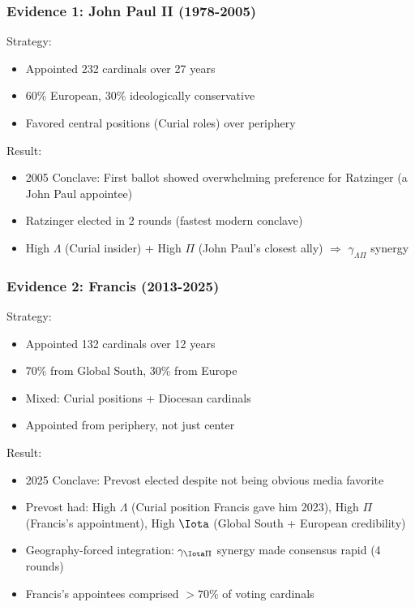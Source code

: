 \subsubsection{Evidence 1: John Paul II (1978-2005)}

Strategy:
\begin{itemize}
\item Appointed 232 cardinals over 27 years
\item 60\% European, 30\% ideologically conservative
\item Favored central positions (Curial roles) over periphery
\end{itemize}

Result:
\begin{itemize}
\item 2005 Conclave: First ballot showed overwhelming preference for Ratzinger (a John Paul appointee)
\item Ratzinger elected in 2 rounds (fastest modern conclave)
\item High $\Lambda$ (Curial insider) + High $\Pi$ (John Paul's closest ally) $\Rightarrow$ $\gamma_{\Lambda\Pi}$ synergy
\end{itemize}

\subsubsection{Evidence 2: Francis (2013-2025)}

Strategy:
\begin{itemize}
\item Appointed 132 cardinals over 12 years
\item 70\% from Global South, 30\% from Europe
\item Mixed: Curial positions + Diocesan cardinals
\item Appointed from periphery, not just center
\end{itemize}

Result:
\begin{itemize}
\item 2025 Conclave: Prevost elected despite not being obvious media favorite
\item Prevost had: High $\Lambda$ (Curial position Francis gave him 2023), High $\Pi$ (Francis's appointment), High $\Iota$ (Global South + European credibility)
\item Geography-forced integration: $\gamma_{\Iota\Pi}$ synergy made consensus rapid (4 rounds)
\item Francis's appointees comprised $>70\%$ of voting cardinals
\end{itemize}


